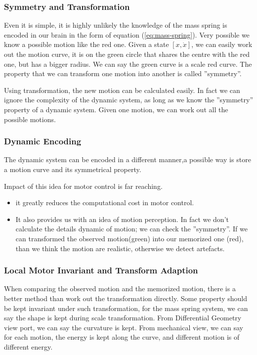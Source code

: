 \subsubsection*{Symmetry and Transformation}
Even it is simple, it is highly unlikely the knowledge of the mass spring is encoded in our brain in the form of equation (\ref{eq:mass-spring}).
Very possible we know a possible motion like the red one.
 Given a state $[x,\dot{x}]$, we can easily work out the motion curve, it is on the green circle that shares the centre with the red one, but has a bigger radius.
 We can say the green curve is a scale red curve.
 The property that we can transform one motion into another is called ''symmetry''.

Using transformation, the new motion can be calculated easily.
In fact we can ignore the complexity of the dynamic system, as long as we know the ''symmetry'' property of a dynamic system. 
Given one motion, we can work out all the possible motions.

\subsubsection*{Dynamic Encoding}

The dynamic system can be encoded in a different manner,a possible way is store a motion curve and its symmetrical property.

Impact of this idea for motor control is far reaching. 
\begin{itemize}
\item it greatly reduces the computational cost in motor control.
\item It also provides us with an idea of motion perception. 
In fact we don’t calculate the details dynamic of motion; we can check the ''symmetry''.
If we can transformed the observed motion(green) into our memorized one (red), than we think the motion are realistic, otherwise we detect artefacts.
\end{itemize}

\subsubsection*{Local Motor Invariant and Transform Adaption}
When comparing the observed motion and the memorized motion, there is a better method than work out the transformation directly. 
Some property should be kept invariant under such transformation, for the mass spring system, we can say the shape is kept during scale transformation. 
From Differential Geometry view port, we can say the curvature is kept. 
From mechanical view, we can say for each motion, the energy is kept along the curve, and different motion is of different energy. 

